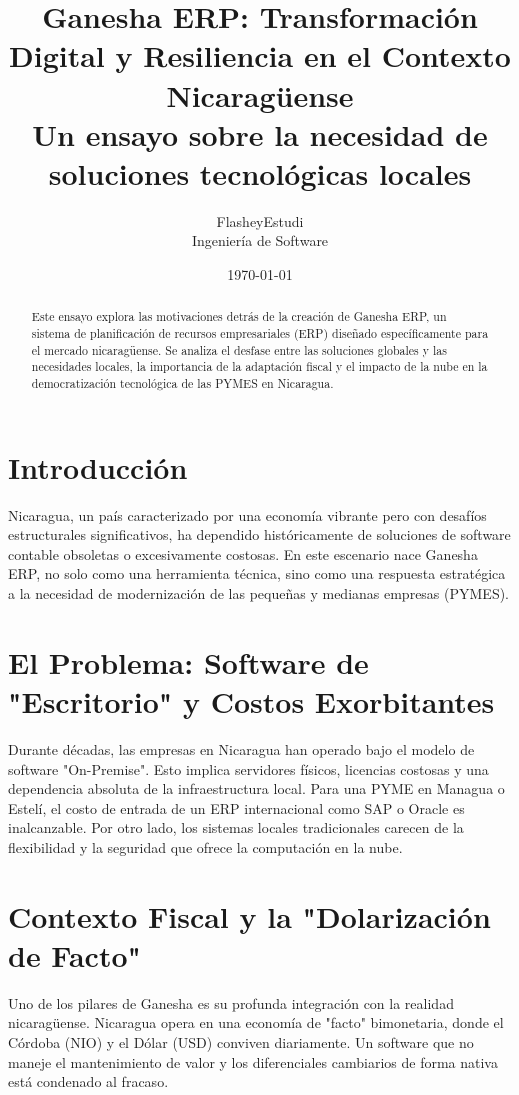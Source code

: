 \documentclass[12pt]{article}
\title{
    \textbf{\huge Ganesha ERP: Transformación Digital y Resiliencia en el Contexto Nicaragüense}\\[0.5cm]
    \large Un ensayo sobre la necesidad de soluciones tecnológicas locales
}
\author{FlasheyEstudi \\ \small Ingeniería de Software}
\date{\today}
\begin{document}
\maketitle

\begin{abstract}
    Este ensayo explora las motivaciones detrás de la creación de Ganesha ERP, un sistema de planificación de recursos empresariales (ERP) diseñado específicamente para el mercado nicaragüense. Se analiza el desfase entre las soluciones globales y las necesidades locales, la importancia de la adaptación fiscal y el impacto de la nube en la democratización tecnológica de las PYMES en Nicaragua.
\end{abstract}

\section{Introducción}
Nicaragua, un país caracterizado por una economía vibrante pero con desafíos estructurales significativos, ha dependido históricamente de soluciones de software contable obsoletas o excesivamente costosas. En este escenario nace Ganesha ERP, no solo como una herramienta técnica, sino como una respuesta estratégica a la necesidad de modernización de las pequeñas y medianas empresas (PYMES).

\section{El Problema: Software de "Escritorio" y Costos Exorbitantes}
Durante décadas, las empresas en Nicaragua han operado bajo el modelo de software "On-Premise". Esto implica servidores físicos, licencias costosas y una dependencia absoluta de la infraestructura local. Para una PYME en Managua o Estelí, el costo de entrada de un ERP internacional como SAP o Oracle es inalcanzable. Por otro lado, los sistemas locales tradicionales carecen de la flexibilidad y la seguridad que ofrece la computación en la nube.

\section{Contexto Fiscal y la "Dolarización de Facto"}
Uno de los pilares de Ganesha es su profunda integración con la realidad nicaragüense. Nicaragua opera en una economía de "facto" bimonetaria, donde el Córdoba (NIO) y el Dólar (USD) conviven diariamente. Un software que no maneje el mantenimiento de valor y los diferenciales cambiarios de forma nativa está condenado al fracaso. 
\end{document}
